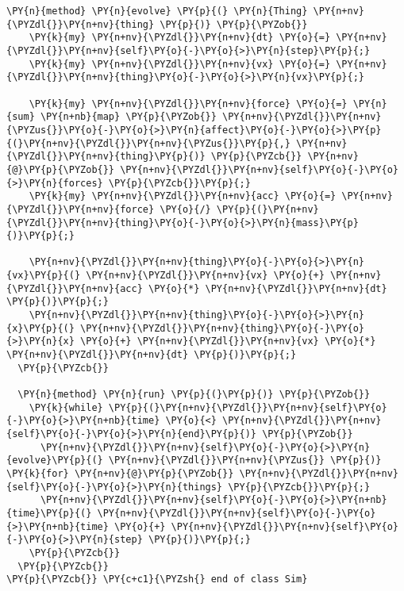 \begin{Verbatim}[commandchars=\\\{\}]
  \PY{n}{method} \PY{n}{evolve} \PY{p}{(} \PY{n}{Thing} \PY{n+nv}{\PYZdl{}}\PY{n+nv}{thing} \PY{p}{)} \PY{p}{\PYZob{}}
    \PY{k}{my} \PY{n+nv}{\PYZdl{}}\PY{n+nv}{dt} \PY{o}{=} \PY{n+nv}{\PYZdl{}}\PY{n+nv}{self}\PY{o}{-}\PY{o}{>}\PY{n}{step}\PY{p}{;}
    \PY{k}{my} \PY{n+nv}{\PYZdl{}}\PY{n+nv}{vx} \PY{o}{=} \PY{n+nv}{\PYZdl{}}\PY{n+nv}{thing}\PY{o}{-}\PY{o}{>}\PY{n}{vx}\PY{p}{;}

    \PY{k}{my} \PY{n+nv}{\PYZdl{}}\PY{n+nv}{force} \PY{o}{=} \PY{n}{sum} \PY{n+nb}{map} \PY{p}{\PYZob{}} \PY{n+nv}{\PYZdl{}}\PY{n+nv}{\PYZus{}}\PY{o}{-}\PY{o}{>}\PY{n}{affect}\PY{o}{-}\PY{o}{>}\PY{p}{(}\PY{n+nv}{\PYZdl{}}\PY{n+nv}{\PYZus{}}\PY{p}{,} \PY{n+nv}{\PYZdl{}}\PY{n+nv}{thing}\PY{p}{)} \PY{p}{\PYZcb{}} \PY{n+nv}{@}\PY{p}{\PYZob{}} \PY{n+nv}{\PYZdl{}}\PY{n+nv}{self}\PY{o}{-}\PY{o}{>}\PY{n}{forces} \PY{p}{\PYZcb{}}\PY{p}{;}
    \PY{k}{my} \PY{n+nv}{\PYZdl{}}\PY{n+nv}{acc} \PY{o}{=} \PY{n+nv}{\PYZdl{}}\PY{n+nv}{force} \PY{o}{/} \PY{p}{(}\PY{n+nv}{\PYZdl{}}\PY{n+nv}{thing}\PY{o}{-}\PY{o}{>}\PY{n}{mass}\PY{p}{)}\PY{p}{;}

    \PY{n+nv}{\PYZdl{}}\PY{n+nv}{thing}\PY{o}{-}\PY{o}{>}\PY{n}{vx}\PY{p}{(} \PY{n+nv}{\PYZdl{}}\PY{n+nv}{vx} \PY{o}{+} \PY{n+nv}{\PYZdl{}}\PY{n+nv}{acc} \PY{o}{*} \PY{n+nv}{\PYZdl{}}\PY{n+nv}{dt} \PY{p}{)}\PY{p}{;}
    \PY{n+nv}{\PYZdl{}}\PY{n+nv}{thing}\PY{o}{-}\PY{o}{>}\PY{n}{x}\PY{p}{(} \PY{n+nv}{\PYZdl{}}\PY{n+nv}{thing}\PY{o}{-}\PY{o}{>}\PY{n}{x} \PY{o}{+} \PY{n+nv}{\PYZdl{}}\PY{n+nv}{vx} \PY{o}{*} \PY{n+nv}{\PYZdl{}}\PY{n+nv}{dt} \PY{p}{)}\PY{p}{;}
  \PY{p}{\PYZcb{}}

  \PY{n}{method} \PY{n}{run} \PY{p}{(}\PY{p}{)} \PY{p}{\PYZob{}}
    \PY{k}{while} \PY{p}{(}\PY{n+nv}{\PYZdl{}}\PY{n+nv}{self}\PY{o}{-}\PY{o}{>}\PY{n+nb}{time} \PY{o}{<} \PY{n+nv}{\PYZdl{}}\PY{n+nv}{self}\PY{o}{-}\PY{o}{>}\PY{n}{end}\PY{p}{)} \PY{p}{\PYZob{}}
      \PY{n+nv}{\PYZdl{}}\PY{n+nv}{self}\PY{o}{-}\PY{o}{>}\PY{n}{evolve}\PY{p}{(} \PY{n+nv}{\PYZdl{}}\PY{n+nv}{\PYZus{}} \PY{p}{)} \PY{k}{for} \PY{n+nv}{@}\PY{p}{\PYZob{}} \PY{n+nv}{\PYZdl{}}\PY{n+nv}{self}\PY{o}{-}\PY{o}{>}\PY{n}{things} \PY{p}{\PYZcb{}}\PY{p}{;}
      \PY{n+nv}{\PYZdl{}}\PY{n+nv}{self}\PY{o}{-}\PY{o}{>}\PY{n+nb}{time}\PY{p}{(} \PY{n+nv}{\PYZdl{}}\PY{n+nv}{self}\PY{o}{-}\PY{o}{>}\PY{n+nb}{time} \PY{o}{+} \PY{n+nv}{\PYZdl{}}\PY{n+nv}{self}\PY{o}{-}\PY{o}{>}\PY{n}{step} \PY{p}{)}\PY{p}{;}
    \PY{p}{\PYZcb{}}
  \PY{p}{\PYZcb{}}
\PY{p}{\PYZcb{}} \PY{c+c1}{\PYZsh{} end of class Sim}
\end{Verbatim}
